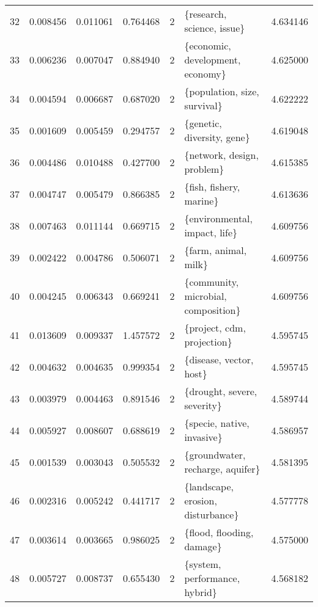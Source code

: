 \begin{tabular}{lrrrrlr}
32  &    0.008456 &  0.011061 &        0.764468 &           2 &              \{research, science, issue\} &  4.634146 \\
33  &    0.006236 &  0.007047 &        0.884940 &           2 &        \{economic, development, economy\} &  4.625000 \\
34  &    0.004594 &  0.006687 &        0.687020 &           2 &            \{population, size, survival\} &  4.622222 \\
35  &    0.001609 &  0.005459 &        0.294757 &           2 &              \{genetic, diversity, gene\} &  4.619048 \\
36  &    0.004486 &  0.010488 &        0.427700 &           2 &              \{network, design, problem\} &  4.615385 \\
37  &    0.004747 &  0.005479 &        0.866385 &           2 &                 \{fish, fishery, marine\} &  4.613636 \\
38  &    0.007463 &  0.011144 &        0.669715 &           2 &           \{environmental, impact, life\} &  4.609756 \\
39  &    0.002422 &  0.004786 &        0.506071 &           2 &                    \{farm, animal, milk\} &  4.609756 \\
40  &    0.004245 &  0.006343 &        0.669241 &           2 &     \{community, microbial, composition\} &  4.609756 \\
41  &    0.013609 &  0.009337 &        1.457572 &           2 &              \{project, cdm, projection\} &  4.595745 \\
42  &    0.004632 &  0.004635 &        0.999354 &           2 &                 \{disease, vector, host\} &  4.595745 \\
43  &    0.003979 &  0.004463 &        0.891546 &           2 &             \{drought, severe, severity\} &  4.589744 \\
44  &    0.005927 &  0.008607 &        0.688619 &           2 &              \{specie, native, invasive\} &  4.586957 \\
45  &    0.001539 &  0.003043 &        0.505532 &           2 &        \{groundwater, recharge, aquifer\} &  4.581395 \\
46  &    0.002316 &  0.005242 &        0.441717 &           2 &       \{landscape, erosion, disturbance\} &  4.577778 \\
47  &    0.003614 &  0.003665 &        0.986025 &           2 &               \{flood, flooding, damage\} &  4.575000 \\
48  &    0.005727 &  0.008737 &        0.655430 &           2 &           \{system, performance, hybrid\} &  4.568182 \\

\end{tabular}
